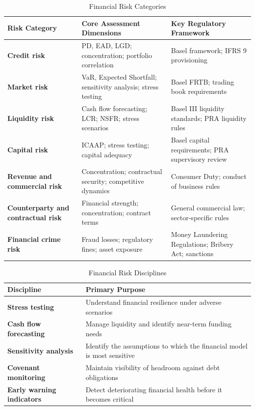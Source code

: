 \begin{table}[H]
  \centering
  \renewcommand{\arraystretch}{1.5}
  \begin{tabularx}{\textwidth}{ | >{\raggedright\arraybackslash}p{} 
								| >{\raggedright\arraybackslash}p{} 
                                | >{\raggedright\arraybackslash}X | }
    \hline
    \textbf{Risk Category} & \textbf{Core Assessment Dimensions} & \textbf{Key Regulatory Framework} \\
    \hline
    \textbf{Credit risk} & PD, EAD, LGD; concentration; portfolio correlation & Basel framework; IFRS 9 provisioning\\
    \hline
    \textbf{Market risk} & VaR, Expected Shortfall; sensitivity analysis; stress testing & Basel FRTB; trading book requirements\\
    \hline
    \textbf{Liquidity risk} & Cash flow forecasting; LCR; NSFR; stress scenarios & Basel III liquidity standards; PRA liquidity rules\\
    \hline
    \textbf{Capital risk} & ICAAP; stress testing; capital adequacy & Basel capital requirements; PRA supervisory review\\
    \hline
    \textbf{Revenue and commercial risk} & Concentration; contractual security; competitive dynamics & Consumer Duty; conduct of business rules\\
    \hline
    \textbf{Counterparty and contractual risk} & Financial strength; concentration; contract terms & General commercial law; sector-specific rules\\
    \hline
    \textbf{Financial crime risk} & Fraud losses; regulatory fines; asset exposure & Money Laundering Regulations; Bribery Act; sanctions\\
    \hline
  \end{tabularx}
  \caption{Financial Risk Categories}
\end{table}

\begin{table}[H]
  \centering
  \renewcommand{\arraystretch}{1.5}
  \begin{tabularx}{\textwidth}{ | >{\raggedright\arraybackslash}p{} 
                                | >{\raggedright\arraybackslash}X | }
    \hline
    \textbf{Discipline} & \textbf{Primary Purpose} \\
    \hline
    \textbf{Stress testing} & Understand financial resilience under adverse scenarios\\
    \hline
    \textbf{Cash flow forecasting} & Manage liquidity and identify near-term funding needs\\
    \hline
    \textbf{Sensitivity analysis} & Identify the assumptions to which the financial model is most sensitive\\
    \hline
    \textbf{Covenant monitoring} & Maintain visibility of headroom against debt obligations\\
    \hline
    \textbf{Early warning indicators} & Detect deteriorating financial health before it becomes critical\\
    \hline
  \end{tabularx}
  \caption{Financial Risk Disciplines}
\end{table}
